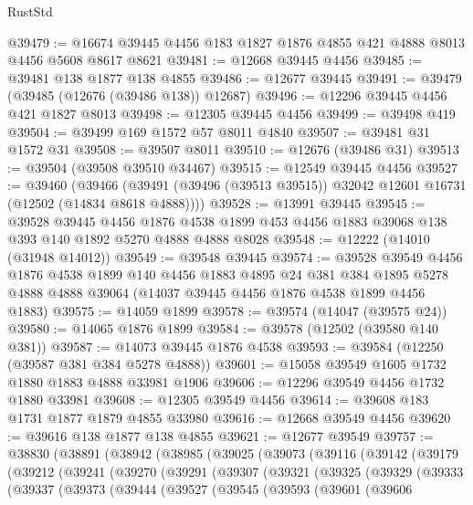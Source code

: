 \begin{lexlean}{RustStd}
\begin{coremodule}
@39479 := @16674 @39445 @4456 @183 @1827 @1876 @4855 @421 @4888 @8013 @4456 @5608 @8617 @8621
@39481 := @12668 @39445 @4456
@39485 := @39481 @138 @1877 @138 @4855
@39486 := @12677 @39445
@39491 := @39479 (@39485 (@12676 (@39486 @138)) @12687)
@39496 := @12296 @39445 @4456 @421 @1827 @8013
@39498 := @12305 @39445 @4456
@39499 := @39498 @419
@39504 := @39499 @169 @1572 @57 @8011 @4840
@39507 := @39481 @31 @1572 @31
@39508 := @39507 @8011
@39510 := @12676 (@39486 @31)
@39513 := @39504 (@39508 @39510 @34467)
@39515 := @12549 @39445 @4456
@39527 := @39460
    (@39466 (@39491 (@39496 (@39513 @39515)) @32042 @12601 @16731 (@12502 (@14834 @8618 @4888))))
@39528 := @13991 @39445
@39545 := @39528
    @39445
    @4456
    @1876
    @4538
    @1899
    @453
    @4456
    @1883
    @39068
    @138
    @393
    @140
    @1892
    @5270
    @4888
    @4888
    @8028
@39548 := @12222 (@14010 (@31948 @14012))
@39549 := @39548 @39445
@39574 := @39528
    @39549
    @4456
    @1876
    @4538
    @1899
    @140
    @4456
    @1883
    @4895
    @24
    @381
    @384
    @1895
    @5278
    @4888
    @4888
    @39064
    (@14037 @39445 @4456 @1876 @4538 @1899 @4456 @1883)
@39575 := @14059 @1899
@39578 := @39574 (@14047 (@39575 @24))
@39580 := @14065 @1876 @1899
@39584 := @39578 (@12502 (@39580 @140 @381))
@39587 := @14073 @39445 @1876 @4538
@39593 := @39584 (@12250 (@39587 @381 @384 @5278 @4888))
@39601 := @15058 @39549 @1605 @1732 @1880 @1883 @4888 @33981 @1906
@39606 := @12296 @39549 @4456 @1732 @1880 @33981
@39608 := @12305 @39549 @4456
@39614 := @39608 @183 @1731 @1877 @1879 @4855 @33980
@39616 := @12668 @39549 @4456
@39620 := @39616 @138 @1877 @138 @4855
@39621 := @12677 @39549
@39757 := @38830
    (@38891
      (@38942
        (@38985
          (@39025
            (@39073
              (@39116
                (@39142
                  (@39179
                    (@39212
                      (@39241
                        (@39270
                          (@39291
                            (@39307
                              (@39321
                                (@39325
                                  (@39329
                                    (@39333
                                      (@39337
                                        (@39373
                                          (@39444
                                            (@39527
                                              (@39545
                                                (@39593
                                                  (@39601
                                                    (@39606

\end{coremodule}
\end{lexlean}
